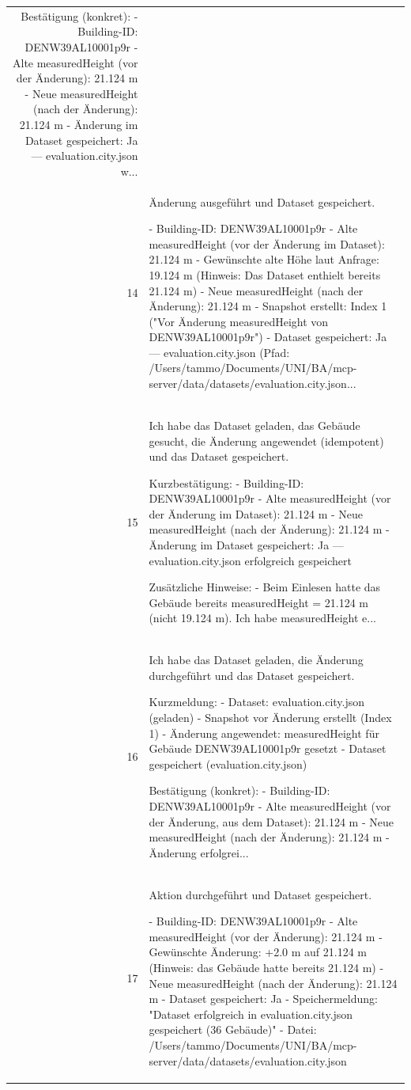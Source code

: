 \documentclass[a4paper,11pt]{article}
\begin{document}
\begin{table}[ht]
\begin{tabular}{r p{12cm}}
Bestätigung (konkret):
- Building-ID: DENW39AL10001p9r
- Alte measuredHeight (vor der Änderung): 21.124 m
- Neue measuredHeight (nach der Änderung): 21.124 m
- Änderung im Dataset gespeichert: Ja — evaluation.city.json w... \\
14 & Änderung ausgeführt und Dataset gespeichert.

- Building-ID: DENW39AL10001p9r
- Alte measuredHeight (vor der Änderung im Dataset): 21.124 m
- Gewünschte alte Höhe laut Anfrage: 19.124 m (Hinweis: Das Dataset enthielt bereits 21.124 m)
- Neue measuredHeight (nach der Änderung): 21.124 m
- Snapshot erstellt: Index 1 ("Vor Änderung measuredHeight von DENW39AL10001p9r")
- Dataset gespeichert: Ja — evaluation.city.json (Pfad: /Users/tammo/Documents/UNI/BA/mcp-server/data/datasets/evaluation.city.json... \\
15 & Ich habe das Dataset geladen, das Gebäude gesucht, die Änderung angewendet (idempotent) und das Dataset gespeichert.

Kurzbestätigung:
- Building-ID: DENW39AL10001p9r
- Alte measuredHeight (vor der Änderung im Dataset): 21.124 m
- Neue measuredHeight (nach der Änderung): 21.124 m
- Änderung im Dataset gespeichert: Ja — evaluation.city.json erfolgreich gespeichert

Zusätzliche Hinweise:
- Beim Einlesen hatte das Gebäude bereits measuredHeight = 21.124 m (nicht 19.124 m). Ich habe measuredHeight e... \\
16 & Ich habe das Dataset geladen, die Änderung durchgeführt und das Dataset gespeichert.

Kurzmeldung:
- Dataset: evaluation.city.json (geladen)
- Snapshot vor Änderung erstellt (Index 1)
- Änderung angewendet: measuredHeight für Gebäude DENW39AL10001p9r gesetzt
- Dataset gespeichert (evaluation.city.json)

Bestätigung (konkret):
- Building-ID: DENW39AL10001p9r
- Alte measuredHeight (vor der Änderung, aus dem Dataset): 21.124 m
- Neue measuredHeight (nach der Änderung): 21.124 m
- Änderung erfolgrei... \\
17 & Aktion durchgeführt und Dataset gespeichert.

- Building-ID: DENW39AL10001p9r
- Alte measuredHeight (vor der Änderung): 21.124 m
- Gewünschte Änderung: +2.0 m auf 21.124 m (Hinweis: das Gebäude hatte bereits 21.124 m)
- Neue measuredHeight (nach der Änderung): 21.124 m
- Dataset gespeichert: Ja
  - Speichermeldung: "Dataset erfolgreich in evaluation.city.json gespeichert (36 Gebäude)"
  - Datei: /Users/tammo/Documents/UNI/BA/mcp-server/data/datasets/evaluation.city.json


\end{tabular}
\end{table}
\end{document}
